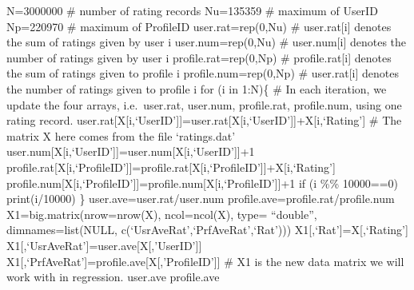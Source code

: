 \documentclass[
]{article}
\begin{document}
N=3000000 \# number of rating records Nu=135359 \# maximum of UserID
Np=220970 \# maximum of ProfileID user.rat=rep(0,Nu) \# user.rat{[}i{]}
denotes the sum of ratings given by user i user.num=rep(0,Nu) \#
user.num{[}i{]} denotes the number of ratings given by user i
profile.rat=rep(0,Np) \# profile.rat{[}i{]} denotes the sum of ratings
given to profile i profile.num=rep(0,Np) \# user.rat{[}i{]} denotes the
number of ratings given to profile i for (i in 1:N)\{ \# In each
iteration, we update the four arrays, i.e.~user.rat, user.num,
profile.rat, profile.num, using one rating record.
user.rat{[}X{[}i,`UserID'{]}{]}=user.rat{[}X{[}i,`UserID'{]}{]}+X{[}i,`Rating'{]}
\# The matrix X here comes from the file `ratings.dat'
user.num{[}X{[}i,`UserID'{]}{]}=user.num{[}X{[}i,`UserID'{]}{]}+1
profile.rat{[}X{[}i,`ProfileID'{]}{]}=profile.rat{[}X{[}i,`ProfileID'{]}{]}+X{[}i,`Rating'{]}
profile.num{[}X{[}i,`ProfileID'{]}{]}=profile.num{[}X{[}i,`ProfileID'{]}{]}+1
if (i \%\% 10000==0) print(i/10000) \} user.ave=user.rat/user.num
profile.ave=profile.rat/profile.num X1=big.matrix(nrow=nrow(X),
ncol=ncol(X), type= ``double'', dimnames=list(NULL,
c(`UsrAveRat',`PrfAveRat',`Rat'))) X1{[},`Rat'{]}=X{[},`Rating'{]}
X1{[},`UsrAveRat'{]}=user.ave{[}X{[},'UserID'{]}{]}
X1{[},`PrfAveRat'{]}=profile.ave{[}X{[},'ProfileID'{]}{]} \# X1 is the
new data matrix we will work with in regression. user.ave profile.ave
\end{document}
